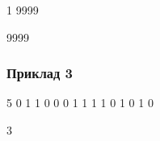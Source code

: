 \documentclass[12pt,a4paper]{article}
\begin{document}
\textbf{}

\begin{codeblock}
1
9999
\end{codeblock}

\textbf{}

\begin{codeblock}
9999
\end{codeblock}


\subsubsection*{Приклад 3}

\textbf{}

\begin{codeblock}
5
0
1 1
0 0 0
1 1 1 1
0 1 0 1 0
\end{codeblock}

\textbf{}

\begin{codeblock}
3
\end{codeblock}
\end{document}
